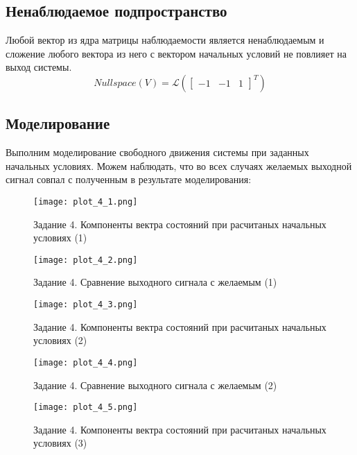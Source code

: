 \subsection{Ненаблюдаемое подпространство}
Любой вектор из ядра матрицы наблюдаемости является ненаблюдаемым и сложение любого вектора из него с вектором
начальных условий не повлияет на выход системы.
\begin{equation*}
    Nullspace(V) = \mathcal{L}(\begin{bmatrix}
        -1 & -1 & 1
    \end{bmatrix}^T)
\end{equation*}

\subsection{Моделирование}
Выполним моделирование свободного движения системы при заданных начальных условиях. Можем наблюдать, что во 
всех случаях желаемых выходной сигнал совпал с полученным в результате моделирования:
\begin{figure}[h]
    \centering
    \texttt{[image: plot\_4\_1.png]}
    \caption{\label{fig:The-caption-1}Задание 4. Компоненты вектра состояний при расчитаных начальных условиях (1)}
\end{figure}

\begin{figure}[]
    \centering
    \texttt{[image: plot\_4\_2.png]}
    \caption{\label{fig:The-caption-1}Задание 4. Сравнение выходного сигнала с желаемым (1)}
\end{figure}

\begin{figure}[]
    \centering
    \texttt{[image: plot\_4\_3.png]}
    \caption{\label{fig:The-caption-1}Задание 4. Компоненты вектра состояний при расчитаных начальных условиях (2)}
\end{figure}

\begin{figure}[]
    \centering
    \texttt{[image: plot\_4\_4.png]}
    \caption{\label{fig:The-caption-1}Задание 4. Сравнение выходного сигнала с желаемым (2)}
\end{figure}

\begin{figure}[]
    \centering
    \texttt{[image: plot\_4\_5.png]}
    \caption{\label{fig:The-caption-1}Задание 4. Компоненты вектра состояний при расчитаных начальных условиях (3)}
\end{figure}

